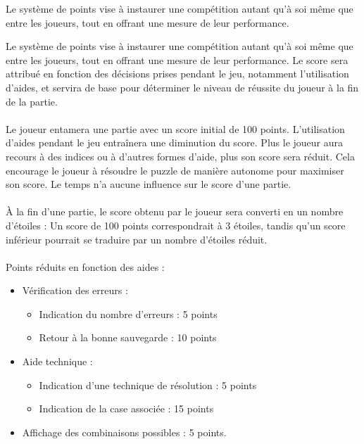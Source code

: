 {
    Le système de points vise à instaurer une compétition autant qu’à soi même que entre les joueurs, tout en
    offrant une mesure de leur performance.
}
{
    Le système de points vise à instaurer une compétition autant qu'à soi même que entre les joueurs, tout en offrant une mesure de leur performance. Le score sera attribué en fonction des décisions prises pendant le jeu, notamment l'utilisation d'aides, et servira de base pour déterminer le niveau de réussite du joueur à la fin de la partie.
    \\
    \\
    Le joueur entamera une partie avec un score initial de 100 points.
    L'utilisation d'aides pendant le jeu entraînera une diminution du score. Plus le joueur aura recours à des indices ou à d'autres formes d'aide, plus son score sera réduit. Cela encourage le joueur à résoudre le puzzle de manière autonome pour maximiser son score. Le temps n'a aucune influence sur le score d'une partie.
    \\
    \\
    À la fin d'une partie, le score obtenu par le joueur sera converti en un nombre d'étoiles : Un score de 100 points correspondrait à 3 étoiles, tandis qu'un score inférieur pourrait se traduire par un nombre d'étoiles réduit.
    \\
    \\
    Points réduits en fonction des aides :
    \noexpand\begin{itemize}[label=$\Rightarrow$]
        \noexpand\item Vérification des erreurs :
            \noexpand\begin{itemize}
                \noexpand\item Indication du nombre d'erreurs : 5 points
                \noexpand\item Retour à la bonne sauvegarde : 10 points
            \noexpand\end{itemize}
        \noexpand\item Aide technique :
            \noexpand\begin{itemize}
                \noexpand\item Indication d'une technique de résolution : 5 points
                \noexpand\item Indication de la case associée : 15 points
            \noexpand\end{itemize}
        \noexpand\item Affichage des combinaisons possibles : 5 points.\\

\end{itemize}}
